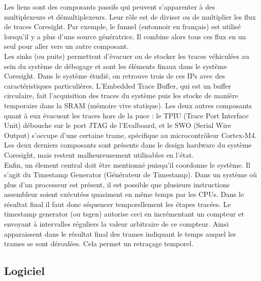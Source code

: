 Les liens sont des composants passifs qui peuvent s'apparenter à des
multiplexeurs et démultiplexeurs. Leur rôle est de diviser ou de multiplier
les flux de traces Coresight. Par exemple, le funnel (entonnoir en français)
est utilisé lorsqu'il y a plus d'une source génératrice. Il combine alors tous
ces flux en un seul pour aller vers un autre composant. \\

Les sinks (ou puits) permettent d'évacuer ou de stocker les traces véhiculées
au sein du système de débogage et sont les éléments finaux dans le système
Coresight. Dans le système étudié, on retrouve trois de ces IPs avec des
caractéristiques particulières. L'Embedded Trace Buffer, qui est un buffer
circulaire, fait l'acquisition des traces du système puis les stocke de
manière temporaire dans la SRAM (mémoire vive statique). Les deux autres
composants quant à eux évacuent les traces hors de la puce : le TPIU (Trace
Port Interface Unit) débouche sur le port JTAG de l'Evalboard, et le SWO
(Serial Wire Output) s'occupe d'une certaine trame, spécifique au
microcontrôleur Cortex-M4. Les deux derniers composants sont présents dans le
design hardware du système Coresight, mais restent malheureusement utilisables
en l'état. \\

Enfin, un élement central doit être mentionné puisqu'il coordonne le système.
Il s'agit du Timestamp Generator (Générateur de Timestamp). Dans un système où
plus d'un processeur est présent, il est possible que plusieurs instructions
assembleur soient exécutées quasiment en même temps par les CPUs. Dans le
résultat final il faut donc séquencer temporellement les étapes tracées. Le
timestamp generator (ou tsgen) autorise ceci en incrémentant un compteur et
envoyant à intervalles réguliers la valeur arbitraire de ce compteur. Ainsi
apparaissent dans le résultat final des trames indiquant le temps auquel les
trames se sont déroulées. Cela permet un retraçage temporel.

\subsection{Logiciel}
\label{chp:part2:subsec:software}


